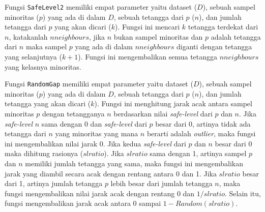 Fungsi \texttt{SafeLevel2} memiliki empat parameter yaitu dataset ($D$), sebuah
sampel minoritas ($p$) yang ada di dalam $D$, sebuah tetangga dari $p$ ($n$),
dan jumlah tetangga dari $p$ yang akan dicari ($k$).
Fungsi ini mencari $k$ tetangga terdekat dari $n$, katakanlah $nneighbours$,
jika $n$ bukan sampel minoritas dan $p$ adalah tetangga dari $n$ maka sampel
$p$ yang ada di dalam $nneighbours$ diganti dengan tetangga yang selanjutnya
($k+1$).
Fungsi ini mengembalikan semua tetangga $nneighbours$ yang kelasnya minoritas.

Fungsi \texttt{RandomGap} memiliki empat parameter yaitu dataset ($D$), sebuah
sampel minoritas ($p$) yang ada di dalam $D$, sebuah tetangga dari $p$ ($n$),
dan jumlah tetangga yang akan dicari ($k$).
Fungsi ini menghitung jarak acak antara sampel minoritas $p$ dengan tetangganya
$n$ berdasarkan nilai \textit{safe-level} dari $p$ dan $n$.
Jika \textit{safe-level} $n$ sama dengan 0 dan \textit{safe-level} dari $p$
besar dari 0, artinya tidak ada tetangga dari $n$ yang minoritas yang mana $n$
berarti adalah \textit{outlier}, maka fungsi ini mengembalikan nilai jarak 0.
Jika kedua \textit{safe-level} dari $p$ dan $n$ besar dari 0 maka dihitung
rasionya ($slratio$).
Jika $slratio$ sama dengan 1, artinya sampel $p$ dan $n$ memiliki jumlah
tetangga yang sama, maka fungsi ini mengembalikan jarak yang diambil secara
acak dengan rentang antara 0 dan 1.
Jika $slratio$ besar dari 1, artinya jumlah tetangga $p$ lebih besar dari
jumlah tetangga $n$, maka fungsi mengembalikan nilai jarak acak dengan rentang
0 dan $1/slratio$.
Selain itu, fungsi mengembalikan jarak acak antara 0 sampai
$1-Random(slratio)$.

